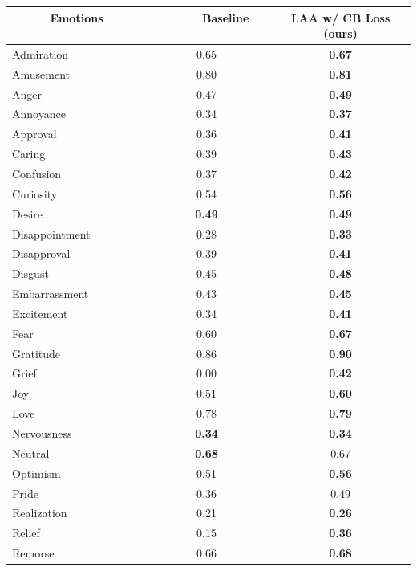 \begin{table}[h]
    \begin{center}
    \begin{tabular}{|l |c| c|}
        \hline
         $\quad \quad \quad$ \textbf{Emotions} $\quad \quad \quad$ &  $\quad \quad \quad $ \textbf{Baseline}  $\quad \quad \quad $ & \textbf{LAA w/ CB Loss (ours)} \\ %
        \hline\hline
        Admiration &  0.65 & \textbf{0.67} \\
        Amusement & 0.80 & \textbf{0.81} \\
        Anger & 0.47 &\textbf{0.49} \\
        Annoyance & 0.34 &\textbf{0.37}\\
        Approval & 0.36 & \textbf{0.41}\\
        Caring & 0.39 & \textbf{0.43} \\
        Confusion & 0.37 &\textbf{0.42} \\
        Curiosity & 0.54 & \textbf{0.56}\\
        Desire & \textbf{0.49} & \textbf{0.49}\\
        Disappointment & 0.28 &\textbf{0.33} \\
        Disapproval & 0.39 & \textbf{0.41} \\
        Disgust & 0.45 & \textbf{0.48} \\
        Embarrassment & 0.43 &\textbf{0.45}\\
        Excitement & 0.34 & \textbf{0.41}\\
        Fear &  0.60 & \textbf{0.67} \\
        Gratitude & 0.86 & \textbf{0.90}\\
        Grief & 0.00 & \textbf{0.42}\\
        Joy & 0.51 & \textbf{0.60}\\
        Love & 0.78 & \textbf{0.79} \\
        Nervousness & \textbf{0.34} & \textbf{0.34} \\
        Neutral & \textbf{0.68} & 0.67\\
        Optimism & 0.51 & \textbf{0.56}\\
        Pride &  0.36 & 0.49\\
        Realization & 0.21 & \textbf{0.26}\\
        Relief & 0.15 & \textbf{0.36} \\
        Remorse & 0.66 & \textbf{0.68} \\

\end{tabular}
\end{center}
\end{table}
